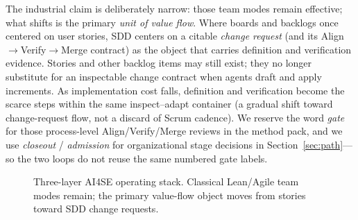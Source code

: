 \documentclass[10pt,conference]{IEEEtran}
\begin{document}
The industrial claim is deliberately narrow: those team modes remain
effective; what shifts is the primary \emph{unit of value flow}.
Where boards and backlogs once centered on user stories, SDD centers on a
citable \emph{change request} (and its Align$\rightarrow$Verify$\rightarrow$Merge
contract) as the object that carries definition and verification evidence.
Stories and other backlog items may still exist; they no longer substitute for
an inspectable change contract when agents draft and apply increments.
As implementation cost falls, definition and verification become the scarce
steps within the same inspect--adapt container (a gradual shift toward
change-request flow, not a discard of Scrum cadence).
We reserve the word \emph{gate} for those process-level Align/Verify/Merge
reviews in the method pack, and we use \emph{closeout} / \emph{admission} for
organizational stage decisions in Section~\ref{sec:path}---so the two loops
do not reuse the same numbered gate labels.

\begin{figure}[t]
\centering
{}
\caption{Three-layer AI4SE operating stack.
Classical Lean/Agile team modes remain; the primary value-flow object moves
from stories toward SDD change requests.}
\label{fig:operating-stack}
\end{figure}
\end{document}

